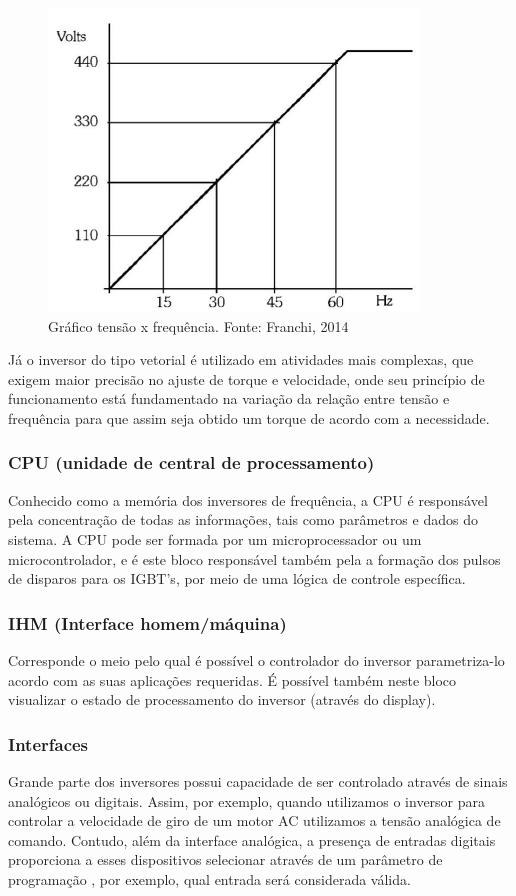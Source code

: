 \documentclass[a4paper, 12pt,oneside, english, brazil]{abntex2}
\begin{document}
\begin{figure}[H]
    \centering
    \includegraphics[scale=0.8]{abaixo.png}
    \caption{Gráfico tensão x frequência. Fonte: Franchi, 2014}
    \label{abaixo}
\end{figure}
Já o inversor do tipo vetorial é utilizado em atividades mais complexas, que exigem maior precisão no ajuste de torque e velocidade, onde seu princípio de funcionamento está fundamentado na variação da relação entre tensão e frequência para que assim seja obtido um torque de acordo com a necessidade. 
\subsubsection{CPU (unidade de central de processamento)}
Conhecido como a memória dos inversores de frequência, a CPU é responsável pela concentração de todas as informações, tais como parâmetros e dados do sistema. A CPU pode ser formada por um microprocessador ou um microcontrolador, e é este bloco responsável também pela a formação dos pulsos de disparos para os IGBT’s, por meio de uma lógica de controle específica.

\subsubsection{IHM (Interface homem/máquina)}
Corresponde o meio pelo qual é possível o controlador do inversor parametriza-lo acordo com as suas aplicações requeridas. É possível também neste bloco visualizar o estado de processamento do inversor (através do display).
\subsubsection{Interfaces}
Grande parte dos inversores possui capacidade de ser controlado através de sinais analógicos ou digitais. Assim, por exemplo, quando utilizamos o inversor para controlar a velocidade de giro de um motor AC utilizamos a tensão analógica de comando. Contudo, além da interface analógica, a presença de entradas digitais proporciona a esses dispositivos selecionar através de um parâmetro de programação , por exemplo, qual entrada será considerada válida. 
\end{document}
